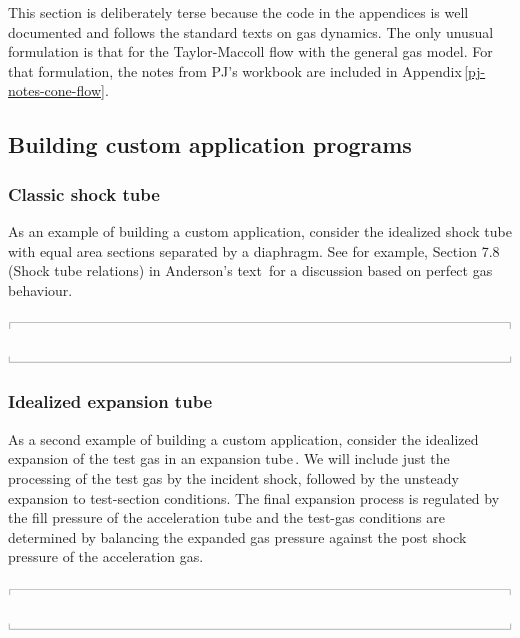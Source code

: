 \documentclass[10pt,a4paper]{article}
\newcommand{\topbar}{\ensuremath{
    \rule{0.1mm}{2.0mm} \rule[2.0mm]{159.5mm}{0.1mm} \rule{0.1mm}{2.0mm}
}}
\newcommand{\bottombar}{\ensuremath{
    \rule{0.1mm}{2.0mm} \rule{159.5mm}{0.1mm} \rule{0.1mm}{2.0mm}
}}
\begin{document}
\medskip
This section is deliberately terse because the code in the appendices is well documented
and follows the standard texts on gas dynamics.
The only unusual formulation is that for the Taylor-Maccoll flow with the general gas model.
For that formulation, the notes from PJ's workbook are included 
in Appendix\,\ref{pj-notes-cone-flow}.


\bigskip
\subsection{Building custom application programs}
\label{custom-apps}
%
\subsubsection*{Classic shock tube}
%
As an example of building a custom application, consider the idealized shock tube 
with equal area sections separated by a diaphragm.
See for example, Section 7.8 (Shock tube relations) in Anderson's text\,\cite{anderson_82}
for a discussion based on perfect gas behaviour.

\medskip
\noindent\topbar

\bottombar

\bigskip
\subsubsection*{Idealized expansion tube}
%
As a second example of building a custom application, consider the idealized expansion
of the test gas in an expansion tube\,\cite{trimpi_62}.
We will include just the processing of the test gas by the incident shock,
followed by the unsteady expansion to test-section conditions. 
The final expansion process is regulated by the fill pressure of the acceleration tube
and the test-gas conditions are determined by balancing the expanded gas pressure against
the post shock pressure of the acceleration gas.

\medskip
\noindent\topbar

\bottombar


\newpage



\end{document}
